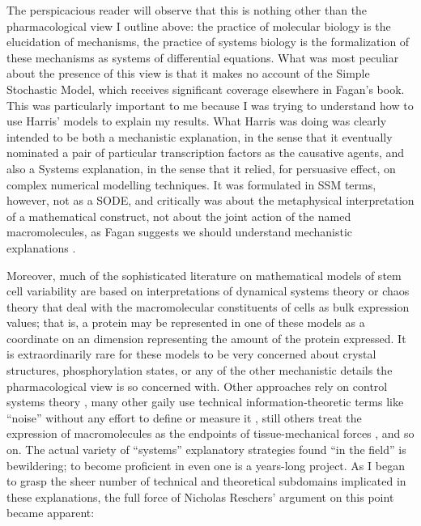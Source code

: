 The perspicacious reader will observe that this is nothing other than the pharmacological view I outline above: the practice of molecular biology is the elucidation of mechanisms, the practice of systems biology is the formalization of these mechanisms as systems of differential equations. What was most peculiar about the presence of this view is that it makes no account of the Simple Stochastic Model, which receives significant coverage elsewhere in Fagan's book. This was particularly important to me because I was trying to understand how to use Harris' models to explain my results. What Harris was doing was clearly intended to be both a mechanistic explanation, in the sense that it eventually nominated a pair of particular transcription factors as the causative agents, and also a Systems explanation, in the sense that it relied, for persuasive effect, on complex numerical modelling techniques. It was formulated in SSM terms, however, not as a SODE, and critically was about the metaphysical interpretation of a mathematical construct, not about the joint action of the named macromolecules, as Fagan suggests we should understand mechanistic explanations \cite{Fagan2013}.

Moreover, much of the sophisticated literature on mathematical models of stem cell variability are based on interpretations of dynamical systems theory or chaos theory \cite{Furusawa2012,Huang2017} that deal with the macromolecular constituents of cells as bulk expression values; that is, a protein may be represented in one of these models as a coordinate on an dimension representing the amount of the protein expressed. It is extraordinarily rare for these models to be very concerned about crystal structures, phosphorylation states, or any of the other mechanistic details the pharmacological view is so concerned with. Other approaches rely on control systems theory \cite{Sun2015,Yang2015a}, many other gaily use technical information-theoretic terms like ``noise'' without any effort to define or measure it \cite{Chang2008}, still others treat the expression of macromolecules as the endpoints of tissue-mechanical forces \cite{Peng2017}, and so on. The actual variety of ``systems'' explanatory strategies found ``in the field'' is bewildering; to become proficient in even one is a years-long project. As I began to grasp the sheer number of technical and theoretical subdomains implicated in these explanations, the full force of Nicholas Reschers' argument on this point became apparent: 

